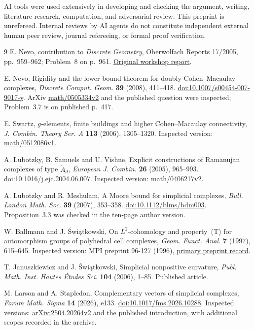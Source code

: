 \documentclass[10pt]{article}
\begin{document}
AI tools were used extensively in developing and checking the argument,
writing, literature research, computation, and adversarial review.
This preprint is unrefereed. Internal reviews by AI agents do not constitute
independent external human peer review, journal refereeing, or formal proof
verification.

\begin{thebibliography}{9}
E. Nevo, contribution to \emph{Discrete Geometry}, Oberwolfach Reports
17/2005, pp.~959--962; Problem~8 on p.~961.
\href{https://ems.press/content/serial-article-files/45990}{Original workshop report}.

E. Nevo, Rigidity and the lower bound theorem for doubly Cohen--Macaulay
complexes, \emph{Discrete Comput. Geom.} \textbf{39} (2008), 411--418.
\href{https://doi.org/10.1007/s00454-007-9017-y}{doi:10.1007/s00454-007-9017-y}.
ArXiv \href{https://arxiv.org/abs/math/0505334v2}{math/0505334v2}
and the published question were inspected; Problem~3.7 is on published p.~417.

E. Swartz, $g$-elements, finite buildings and higher Cohen--Macaulay
connectivity, \emph{J. Combin. Theory Ser. A} \textbf{113} (2006), 1305--1320.
Inspected version: \href{https://arxiv.org/abs/math/0512086v1}{math/0512086v1}.

A. Lubotzky, B. Samuels and U. Vishne, Explicit constructions of Ramanujan
complexes of type $\widetilde A_d$, \emph{European J. Combin.} \textbf{26}
(2005), 965--993.
\href{https://doi.org/10.1016/j.ejc.2004.06.007}{doi:10.1016/j.ejc.2004.06.007}.
Inspected version: \href{https://arxiv.org/abs/math/0406217v2}{math/0406217v2}.

A. Lubotzky and R. Meshulam, A Moore bound for simplicial complexes,
\emph{Bull. London Math. Soc.} \textbf{39} (2007), 353--358.
\href{https://doi.org/10.1112/blms/bdm003}{doi:10.1112/blms/bdm003}.
Proposition~3.3 was checked in the ten-page author version.

W. Ballmann and J. \'Swi\k{a}tkowski, On $L^2$-cohomology and property~(T)
for automorphism groups of polyhedral cell complexes,
\emph{Geom. Funct. Anal.} \textbf{7} (1997), 615--645.
Inspected version: MPI preprint 96-127 (1996),
\href{https://archive.mpim-bonn.mpg.de/id/eprint/2255/}{primary preprint record}.

T. Januszkiewicz and J. \'Swi\k{a}tkowski, Simplicial nonpositive curvature,
\emph{Publ. Math. Inst. Hautes \'Etudes Sci.} \textbf{104} (2006), 1--85.
\href{https://www.numdam.org/article/PMIHES_2006__104__1_0.pdf}{Published article}.

M. Larson and A. Stapledon, Complementary vectors of simplicial complexes,
\emph{Forum Math. Sigma} \textbf{14} (2026), e133.
\href{https://doi.org/10.1017/fms.2026.10288}{doi:10.1017/fms.2026.10288}.
Inspected versions: \href{https://arxiv.org/abs/2504.20264v2}{arXiv:2504.20264v2}
and the published introduction, with additional scopes recorded in the archive.
\end{thebibliography}
\end{document}
